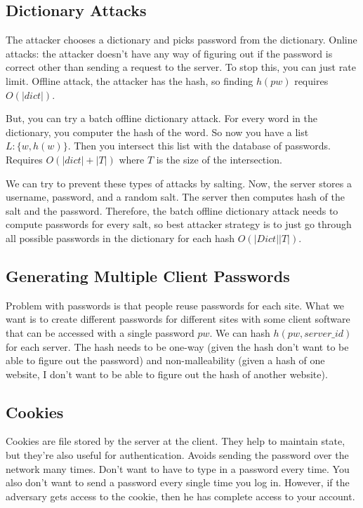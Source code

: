 \documentclass[psamsfonts]{amsart}
\begin{document}
\subsection{Dictionary Attacks}

The attacker chooses a dictionary and picks password from the dictionary. Online attacks: the attacker doesn't have any way of figuring out if the password is correct other than sending a request to the server. To stop this, you can just rate limit. Offline attack, the attacker has the hash, so finding $h(pw)$ requires $O(|dict|)$.

But, you can try a batch offline dictionary attack. For every word in the dictionary, you computer the hash of the word. So now you have a list $L: \{w, h(w) \}$. Then you intersect this list with the database of passwords. Requires $O(|dict| + |T|)$ where $T$ is the size of the intersection.

We can try to prevent these types of attacks by salting. Now, the server stores a username, password, and a random salt. The server then computes hash of the salt and the password. Therefore, the batch offline dictionary attack needs to compute passwords for every salt, so best attacker strategy is to just go through all possible passwords in the dictionary for each hash $O(|Dict||T|)$.

\subsection{Generating Multiple Client Passwords}

Problem with passwords is that people reuse passwords for each site. What we want is to create different passwords for different sites with some client software that can be accessed with a single password $pw$. We can hash $h(pw, server\_id)$ for each server. The hash needs to be one-way (given the hash don't want to be able to figure out the password) and non-malleability (given a hash of one website, I don't want to be able to figure out the hash of another website).

\subsection{Cookies}

Cookies are file stored by the server at the client. They help to maintain state, but they're also useful for authentication. Avoids sending the password over the network many times. Don't want to have to type in a password every time. You also don't want to send a password every single time you log in. However, if the adversary gets access to the cookie, then he has complete access to your account.
\end{document}
